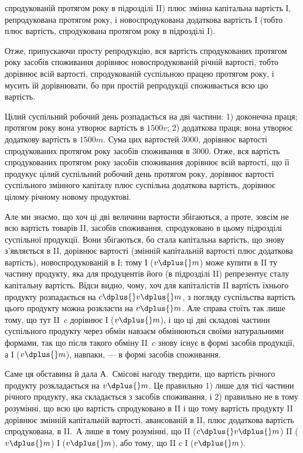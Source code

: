 \parcont{}  %
спродукованій протягом року в підрозділі II) плюс змінна капітальна
вартість І, репродукована протягом року, і новоспродукована додаткова
вартість І (тобто плюс вартість, спродукована протягом року в підрозділі
І).

Отже, припускаючи просту репродукцію, вся вартість спродукованих
протягом року засобів споживання дорівнює новоспродукованій річній
вартості, тобто дорівнює всій вартості, спродукованій суспільною працею
протягом року, і мусить їй дорівнювати, бо при простій репродукції
споживається всю цю вартість.

Цілий суспільний робочий день розпадається на дві частини: 1) доконечна
праця; протягом року вона утворює вартість в $1500 v$; 2) додаткова
праця; вона утворює додаткову вартість в $1500 m$. Сума цих
вартостей \deq{} 3000, дорівнює вартості спродукованих протягом року засобів
споживання в 3000. Отже, вся вартість спродукованих протягом
року засобів споживання дорівнює всій вартості, що її продукує цілий
суспільний робочий день протягом року, дорівнює вартості суспільного змінного
капіталу плюс суспільна додаткова вартість, дорівнює цілому річному
новому продуктові.

Але ми знаємо, що хоч ці дві величини вартости збігаються, а проте,
зовсім не всю вартість товарів II, засобів споживання, спродуковано
в цьому підрозділі суспільної продукції. Вони збігаються, бо стала
капітальна вартість, що знову з’являється в II, дорівнює вартості (змінній
капітальній вартості плюс додаткова вартість), новоспродукованій
в І; тому І ($v \dplus{} m$) може купити в II ту частину продукту, яка для продуцентів
його (в підрозділі II) репрезентує сталу капітальну вартість. Відси
видно, чому, хоч для капіталістів II вартість їхнього продукту розпадається
на $c \dplus{} v \dplus{} m$, з погляду суспільства вартість цього продукту
можна розкласти на $v \dplus{} m$. Але справа стоїть так лише тому, що тут
II~$c$ дорівнює І ($v \dplus{} m$), і що ці дві складові частини суспільного продукту
через обмін навзаєм обмінюються своїми натуральними формами,
так що після такого обміну II~$c$ знову існує в формі засобів продукції,
а І ($v \dplus{} m$), навпаки, — в формі засобів споживання.

Саме ця обставина й дала А.~Смісові нагоду твердити, що вартість
річного продукту розкладається на $v \dplus{} m$. Це правильно 1) лише для
тієї частини річного продукту, яка складається з засобів споживання, і
2) правильно не в тому розумінні, що всю цю вартість спродуковано в II і
що тому вартість продукту II дорівнює змінній капітальній вартості, авансованій
в II, плюс додаткова вартість спродукована, в II.~А лише в тому
розумінні, що II ($c \dplus{} v \dplus{} m$) \deq{} II ($v \dplus{} m$) \dplus{} І ($v \dplus{} m$), або тому, що
II c \deq{} І ($v \dplus{} m$).

